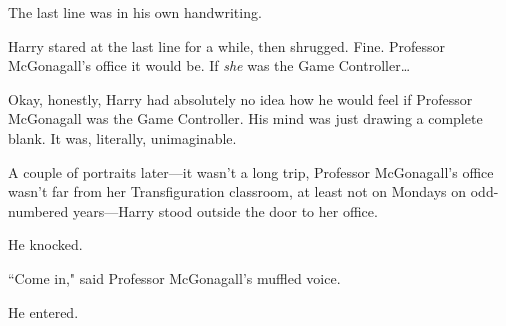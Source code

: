The last line was in his own handwriting.

Harry stared at the last line for a while, then shrugged. Fine. Professor McGonagall's office it would be. If \emph{she} was the Game Controller{\ldots}

Okay, honestly, Harry had absolutely no idea how he would feel if Professor McGonagall was the Game Controller. His mind was just drawing a complete blank. It was, literally, unimaginable.

A couple of portraits later—it wasn't a long trip, Professor McGonagall's office wasn't far from her Transfiguration classroom, at least not on Mondays on odd-numbered years—Harry stood outside the door to her office.

He knocked.

``Come in," said Professor McGonagall's muffled voice.

He entered.

